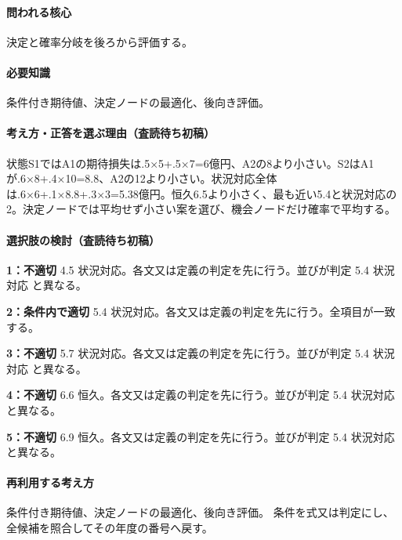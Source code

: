 \paragraph{問われる核心} 決定と確率分岐を後ろから評価する。

\paragraph{必要知識} 条件付き期待値、決定ノードの最適化、後向き評価。

\paragraph{考え方・正答を選ぶ理由（査読待ち初稿）} 状態S1ではA1の期待損失は.5×5+.5×7=\allowbreak{}6億円、A2の8より小さい。S2はA1が.6×8+.4×10=\allowbreak{}8.8、A2の12より小さい。状況対応全体は.6×6+.1×8.8+.3×3=\allowbreak{}5.38億円。恒久6.5より小さく、最も近い5.4と状況対応の2。決定ノードでは平均せず小さい案を選び、機会ノードだけ確率で平均する。

\paragraph{選択肢の検討（査読待ち初稿）}\mbox{}\par

\noindent\textbf{1：不適切} 4.5 状況対応。各文又は定義の判定を先に行う。並びが判定 5.4 状況対応 と異なる。\par

\noindent\textbf{2：条件内で適切} 5.4 状況対応。各文又は定義の判定を先に行う。全項目が一致する。\par

\noindent\textbf{3：不適切} 5.7 状況対応。各文又は定義の判定を先に行う。並びが判定 5.4 状況対応 と異なる。\par

\noindent\textbf{4：不適切} 6.6 恒久。各文又は定義の判定を先に行う。並びが判定 5.4 状況対応 と異なる。\par

\noindent\textbf{5：不適切} 6.9 恒久。各文又は定義の判定を先に行う。並びが判定 5.4 状況対応 と異なる。\par

\paragraph{再利用する考え方} 条件付き期待値、決定ノードの最適化、後向き評価。 条件を式又は判定にし、全候補を照合してその年度の番号へ戻す。

